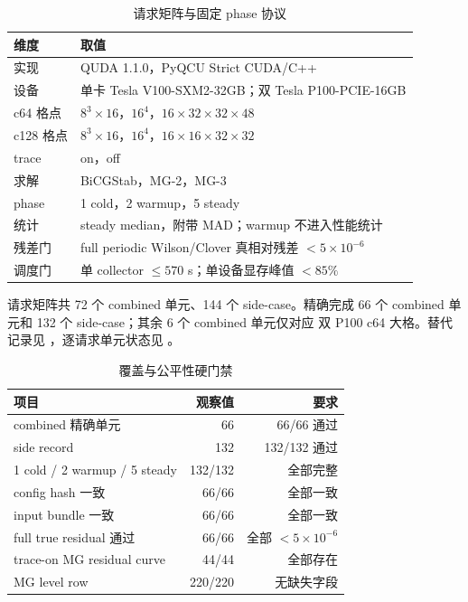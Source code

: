 \documentclass[UTF8,a4paper,11pt]{ctexart}
\begin{document}
\begin{table}[htbp]
\centering
\caption{请求矩阵与固定 phase 协议}
\small
\begin{tabularx}{\textwidth}{@{}L{0.26\textwidth}Y@{}}
\toprule
维度 & 取值 \\
\midrule
实现 & QUDA 1.1.0，PyQCU Strict CUDA/C++ \\
设备 & 单卡 Tesla V100-SXM2-32GB；双 Tesla P100-PCIE-16GB \\
c64 格点 & $8^3\times16$，$16^4$，$16\times32\times32\times48$ \\
c128 格点 & $8^3\times16$，$16^4$，$16\times16\times32\times32$ \\
trace & on，off \\
求解 & BiCGStab，MG-2，MG-3 \\
phase & 1 cold，2 warmup，5 steady \\
统计 & steady median，附带 MAD；warmup 不进入性能统计 \\
残差门 & full periodic Wilson/Clover 真相对残差 $<5\times10^{-6}$ \\
调度门 & 单 collector $\le570$ s；单设备显存峰值 $<85\%$ \\
\bottomrule
\end{tabularx}
\end{table}

请求矩阵共 72 个 combined 单元、144 个 side-case。精确完成 66 个
combined 单元和 132 个 side-case；其余 6 个 combined 单元仅对应
双 P100 c64 大格。替代记录见
，逐请求单元状态见
。

\begin{table}[htbp]
\centering
\caption{覆盖与公平性硬门禁}
\small
\begin{tabular}{@{}lrr@{}}
\toprule
项目 & 观察值 & 要求 \\
\midrule
combined 精确单元 & 66 & 66/66 通过 \\
side record & 132 & 132/132 通过 \\
1 cold / 2 warmup / 5 steady & 132/132 & 全部完整 \\
config hash 一致 & 66/66 & 全部一致 \\
input bundle 一致 & 66/66 & 全部一致 \\
full true residual 通过 & 66/66 & 全部 $<5\times10^{-6}$ \\
trace-on MG residual curve & 44/44 & 全部存在 \\
MG level row & 220/220 & 无缺失字段 \\
\bottomrule
\end{tabular}
\end{table}
\end{document}
